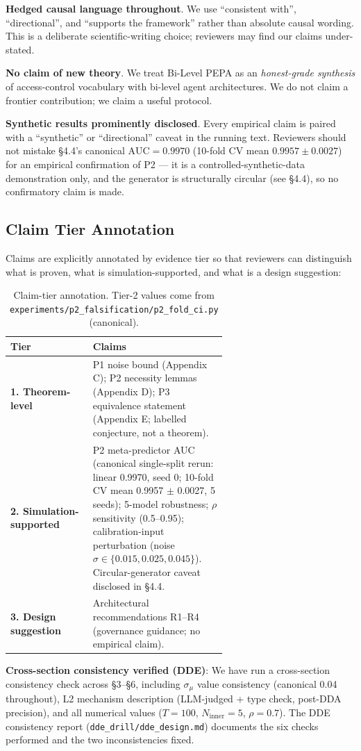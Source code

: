 \documentclass{article}
\theoremstyle{definition}
\begin{document}
\textbf{Hedged causal language throughout}. We use ``consistent with'', ``directional'', and ``supports the framework'' rather than absolute causal wording. This is a deliberate scientific-writing choice; reviewers may find our claims under-stated.

\textbf{No claim of new theory}. We treat Bi-Level PEPA as an \emph{honest-grade synthesis} of access-control vocabulary with bi-level agent architectures. We do not claim a frontier contribution; we claim a useful protocol.

\textbf{Synthetic results prominently disclosed}. Every empirical claim is paired with a ``synthetic'' or ``directional'' caveat in the running text. Reviewers should not mistake \S4.4's canonical $\text{AUC}=0.9970$ (10-fold CV mean $0.9957\pm0.0027$) for an empirical confirmation of P2 --- it is a controlled-synthetic-data demonstration only, and the generator is structurally circular (see \S4.4), so no confirmatory claim is made.


\subsection{Claim Tier Annotation}

Claims are explicitly annotated by evidence tier so that reviewers can distinguish what is proven, what is simulation-supported, and what is a design suggestion:

\begin{table}[h]
\centering
\small
\begin{tabular}{lp{0.62\linewidth}}
\toprule
Tier & Claims \\
\midrule
\textbf{1. Theorem-level} & P1 noise bound (Appendix C); P2 necessity lemmas (Appendix D); P3 equivalence statement (Appendix E; labelled conjecture, not a theorem). \\
\textbf{2. Simulation-supported} & P2 meta-predictor AUC (canonical single-split rerun: linear 0.9970, seed 0; 10-fold CV mean 0.9957 $\pm$ 0.0027, 5 seeds); 5-model robustness; $\rho$ sensitivity (0.5--0.95); calibration-input perturbation (noise $\sigma \in \{0.015, 0.025, 0.045\}$). Circular-generator caveat disclosed in \S4.4. \\
\textbf{3. Design suggestion} & Architectural recommendations R1--R4 (governance guidance; no empirical claim). \\
\bottomrule
\end{tabular}
\caption{Claim-tier annotation. Tier-2 values come from \texttt{experiments/p2\_falsification/p2\_fold\_ci.py} (canonical).}
\label{tab:claim_tiers}
\end{table}
\textbf{Cross-section consistency verified (DDE)}: We have run a cross-section consistency check across \S3--\S6, including $\sigma_\mu$ value consistency (canonical 0.04 throughout), L2 mechanism description (LLM-judged + type check, post-DDA precision), and all numerical values ($T = 100$, $N_{\text{inner}} = 5$, $\rho = 0.7$). The DDE consistency report (\texttt{dde\_drill/dde\_design.md}) documents the six checks performed and the two inconsistencies fixed.
\end{document}
